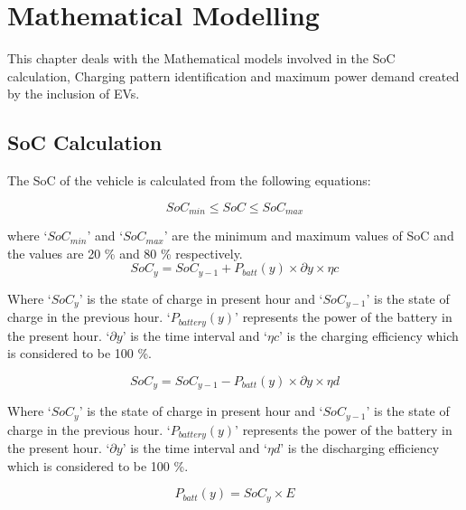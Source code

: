 	\chapter{Mathematical Modelling}
	\label{chap:mathmodel}
	This chapter deals with the Mathematical models involved in the SoC calculation, Charging pattern identification and maximum power demand created by the inclusion of EVs.
	
	\section{SoC Calculation}
	
	
		
	The SoC of the vehicle is calculated from the following equations:
	

			\begin{equation}
		                             SoC_{min} \leq SoC \leq SoC_{max}\label{eq:socminmax}
		    \end{equation}
	    
where `$SoC_{min}$'  and `$SoC_{max}$' are the minimum and maximum values of SoC and the values are 20 \% and 80 \% respectively.
		    \begin{equation}                         
		               SoC_{y} = SoC_{y-1} + P_{batt}(y) \times \partial y \times \eta c
			\end{equation}
		
		Where `$SoC_{y}$' is the state of charge in present hour and `$SoC_{y-1}$' is the state of charge in the previous hour. `$P_{battery}(y)$' represents the power of the battery in the present hour. `$\partial y$' is the time interval and `$\eta c$' is the charging efficiency which is considered to be 100 \%. 
		
		    \begin{equation}             
		               SoC_{y} = SoC_{y-1} - P_{batt}(y) \times \partial y \times \eta d
			\end{equation}
		
		Where `$SoC_{y}$' is the state of charge in present hour and `$SoC_{y-1}$' is the state of charge in the previous hour. `$P_{battery}(y)$' represents the power of the battery in the present hour. `$\partial y$' is the time interval and `$\eta d$' is the discharging efficiency which is considered to be 100 \%.
		
		    \begin{equation}             
		               P_{batt}(y) = SoC_{y} \times E
		    \end{equation}
	    
